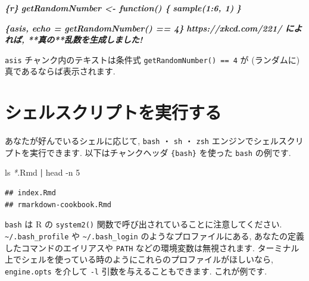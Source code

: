 \documentclass[
  11pt,
  lualatex,ja=standard,jafont=noto]{bxjsreport}
\newenvironment{Shaded}{\begin{snugshade}}{\end{snugshade}}
\newcommand{\AttributeTok}[1]{\textcolor[rgb]{0.77,0.63,0.00}{#1}}
\newcommand{\FunctionTok}[1]{\textcolor[rgb]{0.00,0.00,0.00}{#1}}
\newcommand{\InformationTok}[1]{\textcolor[rgb]{0.56,0.35,0.01}{\textbf{\textit{#1}}}}
\newcommand{\KeywordTok}[1]{\textcolor[rgb]{0.13,0.29,0.53}{\textbf{#1}}}
\newcommand{\NormalTok}[1]{#1}
\newcommand{\PreprocessorTok}[1]{\textcolor[rgb]{0.56,0.35,0.01}{\textit{#1}}}
\begin{document}
\begin{Shaded}
\begin{Highlighting}[]
\InformationTok{\textasciigrave{}\textasciigrave{}\textasciigrave{}\{r\}}
\InformationTok{getRandomNumber \textless{}{-} function() \{}
\InformationTok{  sample(1:6, 1)}
\InformationTok{\}}
\InformationTok{\textasciigrave{}\textasciigrave{}\textasciigrave{}}

\InformationTok{\textasciigrave{}\textasciigrave{}\textasciigrave{}\{asis, echo = getRandomNumber() == 4\}}
\InformationTok{https://xkcd.com/221/ によれば, **真の**乱数を生成しました!}
\InformationTok{\textasciigrave{}\textasciigrave{}\textasciigrave{}}
\end{Highlighting}
\end{Shaded}

\texttt{asis} チャンク内のテキストは条件式 \texttt{getRandomNumber() == 4} が (ランダムに) 真であるならば表示されます.

\hypertarget{eng-bash}{%
\section{シェルスクリプトを実行する}\label{eng-bash}}

あなたが好んでいるシェルに応じて, \texttt{bash} ・ \texttt{sh} ・ \texttt{zsh} エンジンでシェルスクリプトを実行できます. 以下はチャンクヘッダ \texttt{\textasciigrave{}\textasciigrave{}\textasciigrave{}\{bash\}} を使った \texttt{bash} の例です.

\begin{Shaded}
\begin{Highlighting}[numbers=left,,]
\FunctionTok{ls} \PreprocessorTok{*}\NormalTok{.Rmd }\KeywordTok{|} \FunctionTok{head} \AttributeTok{{-}n}\NormalTok{ 5}
\end{Highlighting}
\end{Shaded}

\begin{verbatim}
## index.Rmd
## rmarkdown-cookbook.Rmd
\end{verbatim}

\texttt{bash} は R の \texttt{system2()} 関数で呼び出されていることに注意してください. \texttt{\textasciitilde{}/.bash\_profile} や \texttt{\textasciitilde{}/.bash\_login} のようなプロファイルにある, あなたの定義したコマンドのエイリアスや \texttt{PATH} などの環境変数は無視されます. ターミナル上でシェルを使っている時のようにこれらのプロファイルがほしいなら, \texttt{engine.opts} を介して \texttt{-l} 引数を与えることもできます. これが例です.
\end{document}
